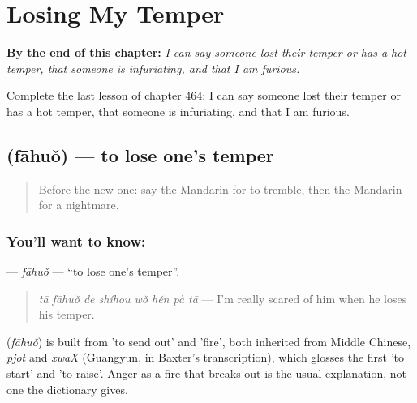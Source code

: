 
\chapter{Losing My Temper}
\label{ch:zh-losing-my-temper}

\begin{chapteropening}
\textbf{By the end of this chapter:} \emph{I can say someone lost their temper or has a hot temper, that someone is infuriating, and that I am furious.}

Complete the last lesson of chapter 464: I can say someone lost their temper or has a hot temper, that someone is infuriating, and that I am furious.
\end{chapteropening}

\section[\texorpdfstring{\zh{发火} (fāhuǒ)}{发火 (fāhuǒ)}]{ (fāhuǒ) — to lose one's temper}

\label{lesson:ZH-C464-fahuo}



\begin{quote}
Before the new one: say the Mandarin for to tremble, then the Mandarin for a nightmare.
\end{quote}

\subsection*{You'll want to know: }
\textbf{} — \emph{fāhuǒ} — \textquotedblleft{}to lose one's temper\textquotedblright{}.

\begin{quote}
\textbf{} \emph{tā fāhuǒ de shíhou wǒ hěn pà tā} — I'm really scared of him when he loses his temper.
\end{quote}

\begin{cousinweb}
\textbf{} (\emph{fāhuǒ}) is built from  'to send out' and  'fire', both inherited from Middle Chinese, \emph{pjot} and \emph{xwaX} (Guangyun, in Baxter's transcription), which glosses the first 'to start' and 'to raise'. Anger as a fire that breaks out is the usual explanation, not one the dictionary gives.
\end{cousinweb}

